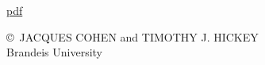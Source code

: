 \label{cohen}\secdown
\href{https://drive.google.com/file/d/0B0u4WeMjO894eHpLcTE2bWU0SjQ/view?usp=sharing}{pdf}

\copyright\ JACQUES COHEN and TIMOTHY J. HICKEY\\
Brandeis University
\bigskip








  
 
\secup